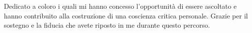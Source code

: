 \cleardoublepage
{}
\thispagestyle{empty}

\vspace*{3cm}

\begin{center}
    Dedicato a coloro i quali mi hanno concesso l'opportunità di essere ascoltato e hanno contribuito alla costruzione di una coscienza critica personale. 
    \newline
    Grazie per il sostegno e la fiducia che avete riposto in me durante questo percorso.
\end{center}
